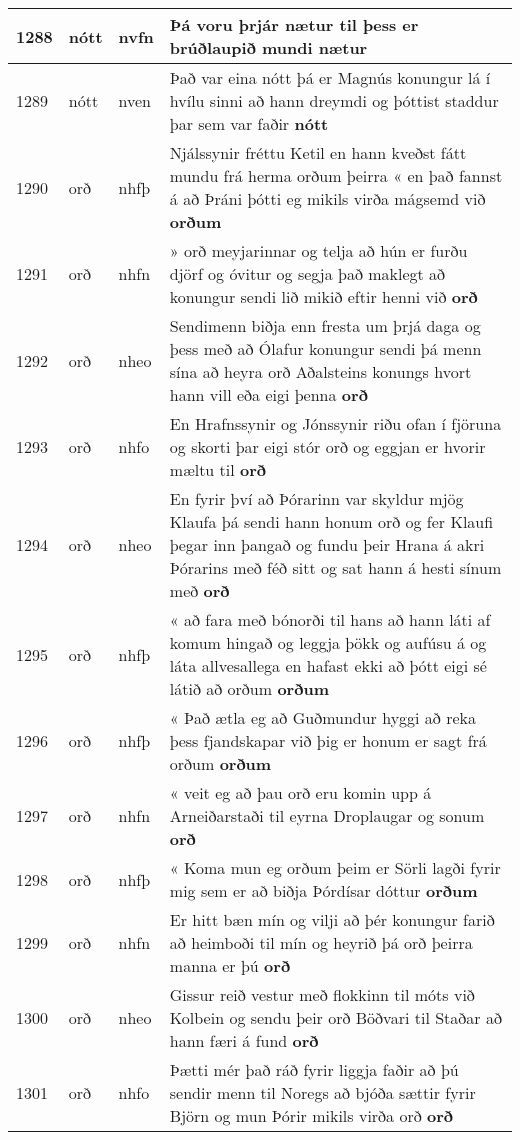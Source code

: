 \documentclass{article}
\begin{document}
\begin{longtable}{p{1cm}|p{1cm}|p{1cm}|p{13cm}}
1288&nótt&nvfn&Þá voru þrjár nætur til þess er brúðlaupið mundi \textbf{nætur} \\
\hline
1289&nótt&nven&Það var eina nótt þá er Magnús konungur lá í hvílu sinni að hann dreymdi og þóttist staddur þar sem var faðir \textbf{nótt} \\
\hline
1290&orð&nhfþ&Njálssynir fréttu Ketil en hann kveðst fátt mundu frá herma orðum þeirra « en það fannst á að Þráni þótti eg mikils virða mágsemd við \textbf{orðum} \\
\hline
1291&orð&nhfn&» orð meyjarinnar og telja að hún er furðu djörf og óvitur og segja það maklegt að konungur sendi lið mikið eftir henni við \textbf{orð} \\
\hline
1292&orð&nheo&Sendimenn biðja enn fresta um þrjá daga og þess með að Ólafur konungur sendi þá menn sína að heyra orð Aðalsteins konungs hvort hann vill eða eigi þenna \textbf{orð} \\
\hline
1293&orð&nhfo&En Hrafnssynir og Jónssynir riðu ofan í fjöruna og skorti þar eigi stór orð og eggjan er hvorir mæltu til \textbf{orð} \\
\hline
1294&orð&nheo&En fyrir því að Þórarinn var skyldur mjög Klaufa þá sendi hann honum orð og fer Klaufi þegar inn þangað og fundu þeir Hrana á akri Þórarins með féð sitt og sat hann á hesti sínum með \textbf{orð} \\
\hline
1295&orð&nhfþ&« að fara með bónorði til hans að hann láti af komum hingað og leggja þökk og aufúsu á og láta allvesallega en hafast ekki að þótt eigi sé látið að orðum \textbf{orðum} \\
\hline
1296&orð&nhfþ&« Það ætla eg að Guðmundur hyggi að reka þess fjandskapar við þig er honum er sagt frá orðum \textbf{orðum} \\
\hline
1297&orð&nhfn&« veit eg að þau orð eru komin upp á Arneiðarstaði til eyrna Droplaugar og sonum \textbf{orð} \\
\hline
1298&orð&nhfþ&« Koma mun eg orðum þeim er Sörli lagði fyrir mig sem er að biðja Þórdísar dóttur \textbf{orðum} \\
\hline
1299&orð&nhfn&Er hitt bæn mín og vilji að þér konungur farið að heimboði til mín og heyrið þá orð þeirra manna er þú \textbf{orð} \\
\hline
1300&orð&nheo&Gissur reið vestur með flokkinn til móts við Kolbein og sendu þeir orð Böðvari til Staðar að hann færi á fund \textbf{orð} \\
\hline
1301&orð&nhfo&Þætti mér það ráð fyrir liggja faðir að þú sendir menn til Noregs að bjóða sættir fyrir Björn og mun Þórir mikils virða orð \textbf{orð} \\

\end{longtable}
\end{document}
